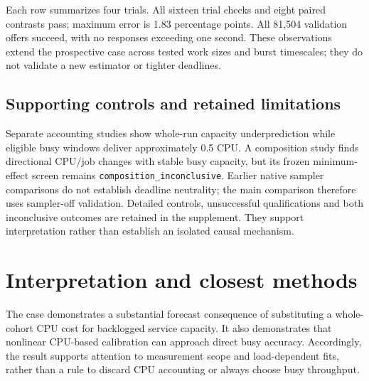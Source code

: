 \documentclass[11pt,a4paper]{article}
\begin{document}
\begin{table}[htbp]\centering\small\setlength{\tabcolsep}{5pt}\caption{Earlier prospective validation across work sizes and burst timescales. Each row summarizes four trials.}\end{table}

Each row summarizes four trials. All sixteen trial checks and eight paired
contrasts pass; maximum error is 1.83 percentage points. All 81,504 validation
offers succeed, with no responses exceeding one second. These observations
extend the prospective case across tested work sizes and burst timescales;
they do not validate a new estimator or tighter deadlines.

\subsection{Supporting controls and retained limitations}

Separate accounting studies show whole-run capacity underprediction while
eligible busy windows deliver approximately 0.5 CPU. A composition study
finds directional CPU/job changes with stable busy capacity, but its frozen
minimum-effect screen remains \texttt{composition\_inconclusive}. Earlier native
sampler comparisons do not establish deadline neutrality; the main comparison
therefore uses sampler-off validation. Detailed controls, unsuccessful
qualifications and both inconclusive outcomes are retained in the supplement.
They support interpretation rather than establish an isolated causal mechanism.

\section{Interpretation and closest methods}

The case demonstrates a substantial forecast consequence of substituting a
whole-cohort CPU cost for backlogged service capacity. It also demonstrates
that nonlinear CPU-based calibration can approach direct busy accuracy.
Accordingly, the result supports attention to measurement scope and
load-dependent fits, rather than a rule to discard CPU accounting or always
choose busy throughput.
\end{document}

